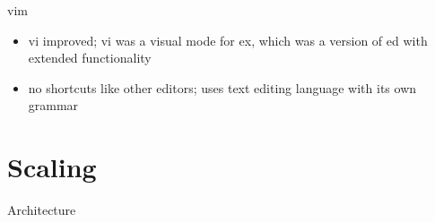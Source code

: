 \documentclass{beamer}
\begin{document}
\begin{frame}{vim}
  \begin{itemize}
    \item vi improved; vi was a visual mode for ex, which was a version of ed
      with extended functionality
    \item no shortcuts like other editors; uses text editing language with its
      own grammar
  \end{itemize}
\end{frame}

\section{Scaling}

\begin{frame}{Architecture}
\end{frame}
\end{document}
